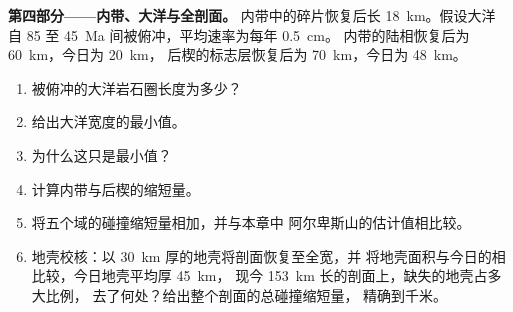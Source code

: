 \begin{problem}
\noindent\textbf{第四部分——内带、大洋与全剖面。}
内带中的碎片恢复后长 \qty{18}{km}。假设大洋
自 85 至 \qty{45}{Ma} 间被俯冲，平均速率为每年 \qty{0.5}{cm}。
内带的陆相恢复后为 \qty{60}{km}，今日为 \qty{20}{km}，
后楔的标志层恢复后为 \qty{70}{km}，今日为 \qty{48}{km}。
\begin{enumerate}[resume]
\item 被俯冲的大洋岩石圈长度为多少？
\item 给出大洋宽度的最小值。
\item 为什么这只是最小值？
\item 计算内带与后楔的缩短量。
\item 将五个域的碰撞缩短量相加，并与本章中
阿尔卑斯山的估计值相比较。
\item 地壳校核：以 \qty{30}{km} 厚的地壳将剖面恢复至全宽，并
将地壳面积与今日的相比较，今日地壳平均厚 \qty{45}{km}，
现今 \qty{153}{km} 长的剖面上，缺失的地壳占多大比例，
去了何处？给出整个剖面的总碰撞缩短量，
精确到千米。
\end{enumerate}
\end{problem}
